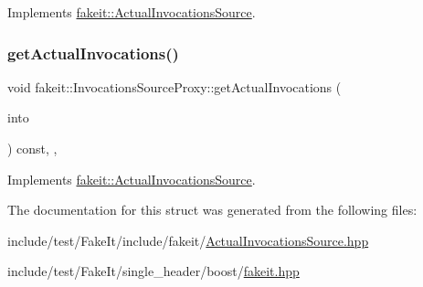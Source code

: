 Implements \mbox{\hyperlink{structfakeit_1_1ActualInvocationsSource_a274de522e11e1f9b8d70c6e0be9e5a9b}{fakeit\+::\+Actual\+Invocations\+Source}}.

\mbox{\label{structfakeit_1_1InvocationsSourceProxy_af06b5d62b0c4ff1e3048fae5d7ddd8c3}} 
\subsubsection{\texorpdfstring{getActualInvocations()}{getActualInvocations()}\hspace{0.1cm}{\footnotesize\ttfamily [9/9]}}
{\footnotesize\ttfamily void fakeit\+::\+Invocations\+Source\+Proxy\+::get\+Actual\+Invocations (\begin{DoxyParamCaption}\item[{std\+::unordered\+\_\+set$<$ \mbox{\hyperlink{structfakeit_1_1Invocation}{fakeit\+::\+Invocation}} $\ast$ $>$ \&}]{into }\end{DoxyParamCaption}) const\hspace{0.3cm}{\ttfamily [inline]}, {\ttfamily [override]}, {\ttfamily [virtual]}}



Implements \mbox{\hyperlink{structfakeit_1_1ActualInvocationsSource_a274de522e11e1f9b8d70c6e0be9e5a9b}{fakeit\+::\+Actual\+Invocations\+Source}}.



The documentation for this struct was generated from the following files\+:\begin{DoxyCompactItemize}
\item 
include/test/\+Fake\+It/include/fakeit/\mbox{\hyperlink{ActualInvocationsSource_8hpp}{Actual\+Invocations\+Source.\+hpp}}\item 
include/test/\+Fake\+It/single\+\_\+header/boost/\mbox{\hyperlink{single__header_2boost_2fakeit_8hpp}{fakeit.\+hpp}}\end{DoxyCompactItemize}
